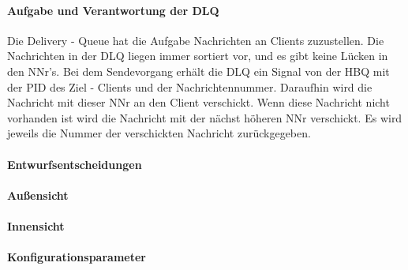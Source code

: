 \documentclass{article}
\begin{document}
			\paragraph{Aufgabe und Verantwortung der DLQ}
				Die Delivery - Queue hat die Aufgabe Nachrichten an Clients zuzustellen. 
				Die Nachrichten in der DLQ liegen immer sortiert vor, und es gibt keine Lücken in den NNr’s.
				Bei dem Sendevorgang erhält die DLQ ein Signal von der HBQ mit der PID des Ziel - Clients und der Nachrichtennummer. Daraufhin wird die Nachricht mit dieser NNr an den Client verschickt.
				Wenn diese Nachricht nicht vorhanden ist wird die Nachricht mit der nächst höheren NNr verschickt. 
				Es wird jeweils die Nummer der verschickten Nachricht zurückgegeben.
			\paragraph{Entwurfsentscheidungen}
			\paragraph{Außensicht}
			\paragraph{Innensicht}
			\paragraph{Konfigurationsparameter}
\end{document}
